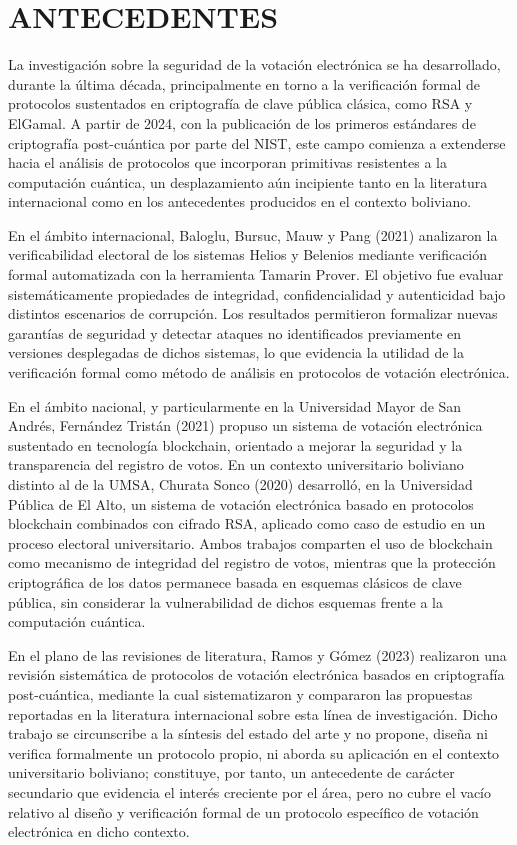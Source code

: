 \section{ANTECEDENTES}
\label{sec:antecedentes}

La investigación sobre la seguridad de la votación electrónica se ha desarrollado, durante la última década, principalmente en torno a la verificación formal de protocolos sustentados en criptografía de clave pública clásica, como RSA y ElGamal. A partir de 2024, con la publicación de los primeros estándares de criptografía post-cuántica por parte del NIST, este campo comienza a extenderse hacia el análisis de protocolos que incorporan primitivas resistentes a la computación cuántica, un desplazamiento aún incipiente tanto en la literatura internacional como en los antecedentes producidos en el contexto boliviano.

En el ámbito internacional, Baloglu, Bursuc, Mauw y Pang (2021) analizaron la verificabilidad electoral de los sistemas Helios y Belenios mediante verificación formal automatizada con la herramienta Tamarin Prover. El objetivo fue evaluar sistemáticamente propiedades de integridad, confidencialidad y autenticidad bajo distintos escenarios de corrupción. Los resultados permitieron formalizar nuevas garantías de seguridad y detectar ataques no identificados previamente en versiones desplegadas de dichos sistemas, lo que evidencia la utilidad de la verificación formal como método de análisis en protocolos de votación electrónica.

En el ámbito nacional, y particularmente en la Universidad Mayor de San Andrés, Fernández Tristán (2021) propuso un sistema de votación electrónica sustentado en tecnología blockchain, orientado a mejorar la seguridad y la transparencia del registro de votos. En un contexto universitario boliviano distinto al de la UMSA, Churata Sonco (2020) desarrolló, en la Universidad Pública de El Alto, un sistema de votación electrónica basado en protocolos blockchain combinados con cifrado RSA, aplicado como caso de estudio en un proceso electoral universitario. Ambos trabajos comparten el uso de blockchain como mecanismo de integridad del registro de votos, mientras que la protección criptográfica de los datos permanece basada en esquemas clásicos de clave pública, sin considerar la vulnerabilidad de dichos esquemas frente a la computación cuántica.

En el plano de las revisiones de literatura, Ramos y Gómez (2023) realizaron una revisión sistemática de protocolos de votación electrónica basados en criptografía post-cuántica, mediante la cual sistematizaron y compararon las propuestas reportadas en la literatura internacional sobre esta línea de investigación. Dicho trabajo se circunscribe a la síntesis del estado del arte y no propone, diseña ni verifica formalmente un protocolo propio, ni aborda su aplicación en el contexto universitario boliviano; constituye, por tanto, un antecedente de carácter secundario que evidencia el interés creciente por el área, pero no cubre el vacío relativo al diseño y verificación formal de un protocolo específico de votación electrónica en dicho contexto.

